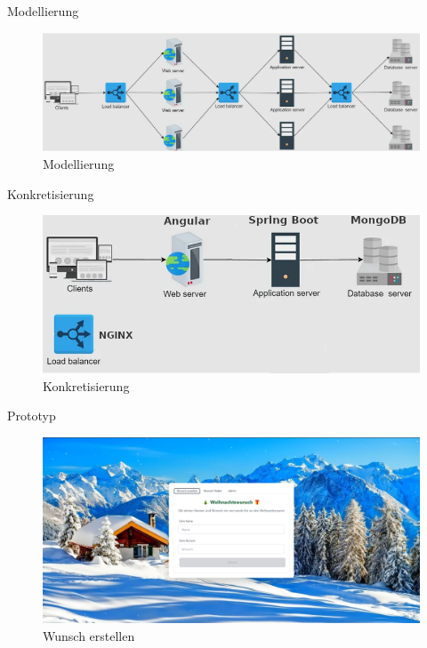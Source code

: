 \documentclass{beamer}
\begin{document}
\begin{frame}{Modellierung}
\begin{figure}
    \centering
\includegraphics[width=\textwidth, keepaspectratio]{loads}
\caption{Modellierung \cite{b}}
\end{figure}
\end{frame}

\begin{frame}{Konkretisierung}
\begin{figure}
    \centering
\includegraphics[width=\textwidth, keepaspectratio]{proto}
\caption{Konkretisierung \cite{b}}
\end{figure}
\end{frame}

\begin{frame}{Prototyp}
\begin{figure}
    \centering
\includegraphics[width=\textwidth, keepaspectratio]{funk1}
\caption{Wunsch erstellen \cite{f}\cite{g}}
\end{figure}
\end{frame}
\end{document}
